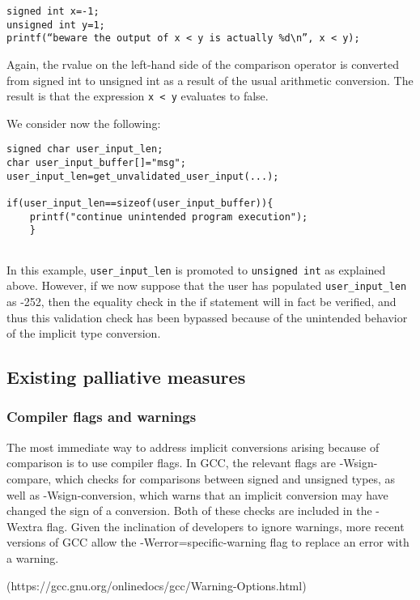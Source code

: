 \documentclass[11pt,letterpaper]{article}
\begin{document}
\begin{lstlisting}[style=CStyle]
signed int x=-1;
unsigned int y=1;
printf(“beware the output of x < y is actually %d\n”, x < y);
\end{lstlisting}

Again, the rvalue on the left-hand side of the comparison operator is converted from signed int to unsigned int as a result of the usual arithmetic conversion.
The result is that the expression \texttt{x < y} evaluates to false.

We consider now the following:

\begin{lstlisting}[style=CStyle]
signed char user_input_len;
char user_input_buffer[]="msg";
user_input_len=get_unvalidated_user_input(...);

if(user_input_len==sizeof(user_input_buffer)){
	printf("continue unintended program execution");
	}	
 	
\end{lstlisting}

In this example,  \texttt{user\_input\_len} is promoted to \texttt{unsigned int} as explained above. However, if we now suppose that the user has populated \texttt{user\_input\_len} as -252, then the equality check in the if statement will in fact be verified, and thus this validation check has been bypassed because of the unintended behavior of the implicit type conversion. 

\subsection{Existing palliative measures}

\subsubsection{Compiler flags and warnings}
The most immediate way to address implicit conversions arising because of comparison is to use compiler flags. In GCC, the relevant flags are -Wsign-compare, which checks for comparisons between signed and unsigned types, as well as -Wsign-conversion, which warns that an implicit conversion may have changed the sign of a conversion. Both of these checks are included in the -Wextra flag. Given the inclination of developers to ignore warnings, more recent versions of GCC allow the -Werror=specific-warning flag to replace an error with a warning.

(https://gcc.gnu.org/onlinedocs/gcc/Warning-Options.html)
\end{document}
